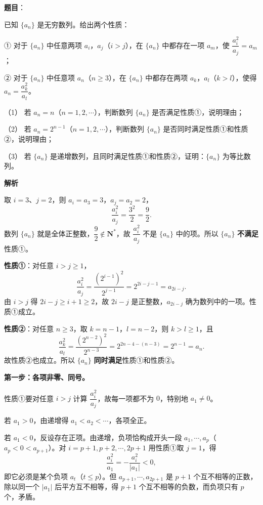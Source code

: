 \begin{answer}

\textbf{题目}：

已知 $\{a_n\}$ 是无穷数列。给出两个性质：

① 对于 $\{a_n\}$ 中任意两项 $a_i$，$a_j$（$i>j$），在 $\{a_n\}$ 中都存在一项 $a_m$，使 $\dfrac{a_i^2}{a_j}=a_m$；

② 对于 $\{a_n\}$ 中任意项 $a_n$（$n\geqslant3$），在 $\{a_n\}$ 中都存在两项 $a_k$，$a_l$（$k>l$），使得 $a_n=\dfrac{a_k^2}{a_l}$。

（1） 若 $a_n=n$（$n=1,2,\cdots$），判断数列 $\{a_n\}$ 是否满足性质①，说明理由；

（2） 若 $a_n=2^{n-1}$（$n=1,2,\cdots$），判断数列 $\{a_n\}$ 是否同时满足性质①和性质②，说明理由；

（3） 若 $\{a_n\}$ 是递增数列，且同时满足性质①和性质②，证明：$\{a_n\}$ 为等比数列。

\textbf{解析}


取 $i=3$、$j=2$，则 $a_i=a_3=3$，$a_j=a_2=2$，
\nopagebreak[4]
\[\frac{a_i^2}{a_j}=\frac{3^2}2=\frac92 .\]
数列 $\{a_n\}$ 就是全体正整数，$\dfrac92\notin\mathbf N^*$，故 $\dfrac{a_i^2}{a_j}$ 不是 $\{a_n\}$ 中的项。所以 $\{a_n\}$ \textbf{不满足}性质①。


\textbf{性质①}：对任意 $i>j\geqslant1$，
\nopagebreak[4]
\[\frac{a_i^2}{a_j}=\frac{\left(2^{i-1}\right)^2}{2^{j-1}}=2^{2i-j-1}=a_{2i-j} .\]
由 $i>j$ 得 $2i-j\geqslant i+1\geqslant2$，故 $2i-j$ 是正整数，$a_{2i-j}$ 确为数列中的一项。性质①成立。

\textbf{性质②}：对任意 $n\geqslant3$，取 $k=n-1$，$l=n-2$，则 $k>l\geqslant1$，且
\nopagebreak[4]
\[\frac{a_k^2}{a_l}=\frac{\left(2^{n-2}\right)^2}{2^{n-3}}=2^{2n-4-(n-3)}=2^{n-1}=a_n .\]
故性质②也成立。所以 $\{a_n\}$ \textbf{同时满足}性质①和性质②。


\textbf{第一步：各项非零、同号。}

性质①要对任意 $i>j$ 计算 $\dfrac{a_i^2}{a_j}$，故每一项都不为 $0$，特别地 $a_1\neq0$。

若 $a_1>0$，由递增得 $a_1<a_2<\cdots$，各项全正。

若 $a_1<0$，反设存在正项。由递增，负项恰构成开头一段 $a_1,\cdots,a_p$（$a_p<0<a_{p+1}$）。对 $i=p+1,p+2,\cdots,2p+1$ 用性质①取 $j=1$，得
\nopagebreak[4]
\[\frac{a_i^2}{a_1}=-\frac{a_i^2}{|a_1|}<0,\]
即它必须是某个负项 $a_t$（$t\leqslant p$）。但 $a_{p+1},\cdots,a_{2p+1}$ 是 $p+1$ 个互不相等的正数，除以同一个 $|a_1|$ 后平方互不相等，得 $p+1$ 个互不相等的负数，而负项只有 $p$ 个，矛盾。


\end{answer}
